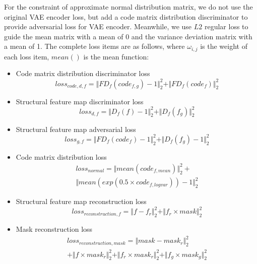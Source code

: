 \documentclass{ecai}
\begin{document}
For the constraint of approximate normal distribution matrix, we do not use the original VAE encoder loss, but add a code matrix distribution discriminator to provide adversarial loss for VAE encoder. Meanwhile, we use $L2$ regular loss to guide the mean matrix with a mean of 0 and the variance deviation matrix with a mean of 1.
The complete loss items are as follows, where $\omega_{i,j}$ is the weight of each loss item, $mean()$ is the mean function: 
\begin{itemize}
	\item{Code matrix distribution discriminator loss} 
	\begin{equation}
		loss_{code,d,f}=\Vert{FD_f(code_{f,g})-1}\Vert_{2}^{2}+\Vert{FD_f(code_f)}\Vert_{2}^{2}
	\end{equation}
	
	\item{Structural feature map discriminator loss} 
	\begin{equation}
		loss_{d,f}=\Vert{D_f(f)-1}\Vert_{2}^{2}+\Vert{D_f(f_g )}\Vert_{2}^{2}
	\end{equation}
	
	\item{Structural feature map adversarial loss} 
	\begin{equation}
		loss_{g,f}=\Vert{FD_f(code_f)-1}\Vert_{2}^{2}+\Vert{D_f(f_g)-1}\Vert_{2}^{2}
	\end{equation}
	
	\item{Code matrix distribution loss } 
	\begin{equation}
	\begin{split}
	loss_{normal}=\Vert{mean(code_{f,mean})}\Vert_{2}^{2}+ \\
	\Vert{mean(exp(0.5\times code_{f,logvar}))-1}\Vert_{2}^{2}
	\end{split}
	\end{equation}
	
	\item{Structural feature map reconstruction loss} 
	\begin{equation}
		loss_{reconstruction,f}=\Vert{f-f_r}\Vert_{2}^{2}+\Vert{f_r\times mask}\Vert_{2}^{2}
	\end{equation}
	
	\item{Mask reconstruction loss}
	\begin{equation}
	\begin{split}
	loss_{reconstruction,mask}=\Vert{mask-mask_r }\Vert_{2}^{2}\\
	+\Vert{f\times mask_r}\Vert_{2}^{2}+\Vert{f_r\times mask_r}\Vert_{2}^{2}+\Vert{f_g\times mask_g}\Vert_{2}^{2}
	\end{split}
	\end{equation}
\end{itemize}
\end{document}

